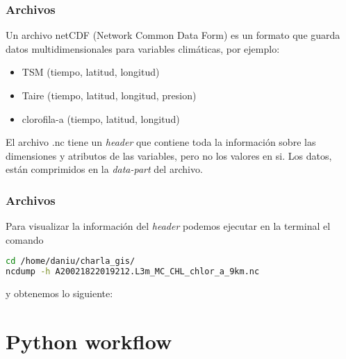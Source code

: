 \documentclass{beamer}
\begin{document}
\begin{frame}[fragile]
\frametitle{Archivos}

Un archivo netCDF (Network Common Data Form) es un formato que guarda datos multidimensionales para variables climáticas, por ejemplo:

\begin{itemize}
	
	\item TSM (tiempo, latitud, longitud)
	\item Taire (tiempo, latitud, longitud, presion)
	\item clorofila-a (tiempo, latitud, longitud)
	
\end{itemize}

\pause

El archivo .nc tiene un \textit{header} que contiene toda la información sobre las dimensiones y atributos de las variables, pero no los valores en si. Los datos, están comprimidos en la \textit{data-part} del archivo. 

\end{frame}


\begin{frame}[fragile]
\frametitle{Archivos}

Para visualizar la información del \textit{header} podemos ejecutar en la terminal el comando

\begin{lstlisting}[language=bash, basicstyle=\scriptsize]
cd /home/daniu/charla_gis/
ncdump -h A20021822019212.L3m_MC_CHL_chlor_a_9km.nc
\end{lstlisting}

y obtenemos lo siguiente:

\begin{figure}


\end{figure}

\end{frame}

\section{Python workflow}
\end{document}
